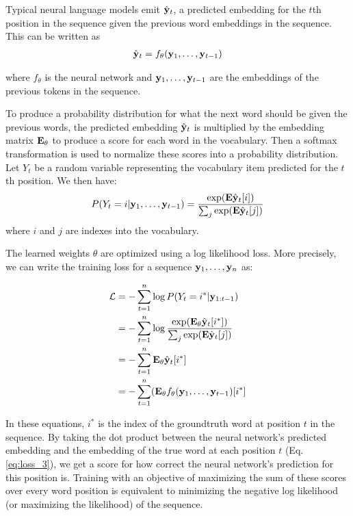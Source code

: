 Typical neural language models emit $\hat{\mathbf{y}}_t$, a predicted embedding for the $t$th position in the sequence given the previous word embeddings in the sequence. This can be written as
\begin{align}
    \hat{\mathbf{y}}_t = f_\theta(\mathbf{y}_1, \ldots, \mathbf{y}_{t-1})
    \label{eq:lm_feq}
\end{align}

where $f_\theta$ is the neural network and $\mathbf{y}_1, \ldots, \mathbf{y}_{t-1}$ are the embeddings of the previous tokens in the sequence.

To produce a probability distribution for what the next word should be given the previous words, the predicted embedding $\hat{\mathbf{y}}_t$ is multiplied by the embedding matrix $\mathbf{E}_\theta$ to produce a score for each word in the vocabulary.
Then a softmax transformation is used to normalize these scores into a probability distribution.
Let $Y_t$ be a random variable representing the vocabulary item predicted for the $t$th position. We then have:
\begin{align}
    \label{equation:vocab}
    P(Y_t=i | \mathbf{y}_1, \ldots, \mathbf{y}_{t-1}) = \frac{\exp(\mathbf{E}\hat{\mathbf{y}}_t[i])}{\sum_j\exp(\mathbf{E}\hat{\mathbf{y}}_t[j])}
\end{align}
where $i$ and $j$ are indexes into the vocabulary.

The learned weights $\theta$ are optimized using a log likelihood loss.
More precisely, we can write the training loss for a sequence $\mathbf{y}_1, \ldots, \mathbf{y}_n$ as:

\begin{align}
\mathcal{L} &= -\sum_{t=1}^n \log P(Y_t=i^* | \mathbf{y}_{1:t-1}) \\
&= -\sum_{t=1}^n \log\frac{\exp(\mathbf{E}_\theta\hat{\mathbf{y}}_t[i^*])}{\sum_j\exp(\mathbf{E}\hat{\mathbf{y}}_t[j])} \label{eq:loss_2} \\
&= -\sum_{t=1}^n \mathbf{E}_\theta\hat{\mathbf{y}}_t[i^*] \label{eq:loss_3} \\
&= -\sum_{t=1}^n (\mathbf{E}_\theta f_\theta(\mathbf{y}_1, \ldots, \mathbf{y}_{t-1})[i^*]
\end{align}

In these equations, $i^*$ is the index of the groundtruth word at position $t$ in the sequence. 
By taking the dot product between the neural network's predicted embedding and the embedding of the true word at each position $t$ (Eq. \ref{eq:loss_3}), we get a score for how correct the neural network's prediction for this position is.
Training with an objective of maximizing the sum of these scores over every word position is equivalent to minimizing the negative log likelihood (or maximizing the likelihood) of the sequence.

